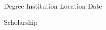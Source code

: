 

\begin{cventries}

  \cventry
    {Degree} %
    {Institution} %
    {Location} %
    {Date} %
    {
      \begin{cvitems} %
        \item {Scholarship}
      \end{cvitems}
    }

\end{cventries}
